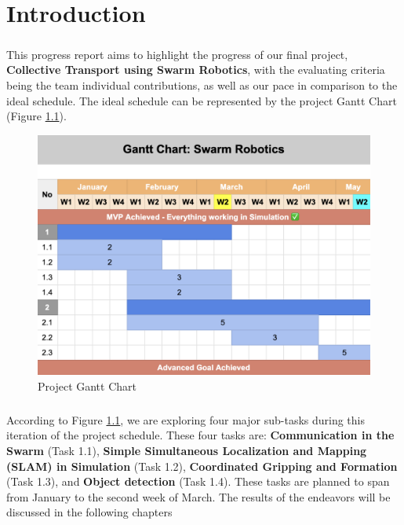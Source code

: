 \chapter{Introduction}

\paragraph*{}
This progress report aims to highlight the progress of our final project, \textbf{Collective Transport using Swarm Robotics}, with the evaluating criteria being the team individual contributions, as well as our pace in comparison to the ideal schedule. The ideal schedule can be represented by the project Gantt Chart (Figure \ref{fig:gantt_chart}).

\begin{figure}
    \centering
    \includegraphics[width=1\linewidth]{assets/images/timeline/gantt_chart.png}
    \caption{Project Gantt Chart}
    \label{fig:gantt_chart}
\end{figure}

\paragraph*{}
According to Figure \ref{fig:gantt_chart}, we are exploring four major sub-tasks during this iteration of the project schedule. These four tasks are: \textbf{Communication in the Swarm} (Task 1.1), \textbf{Simple Simultaneous Localization and Mapping (SLAM) in Simulation} (Task 1.2), \textbf{Coordinated Gripping and Formation} (Task 1.3), and \textbf{Object detection} (Task 1.4). These tasks are planned to span from January to the second week of March. The results of the endeavors will be discussed in the following chapters


